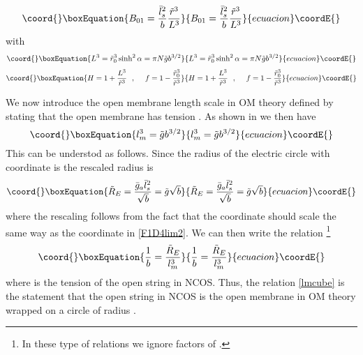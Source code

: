 \documentclass[a4paper,twoside,titlepage,12pt]{article}
\begin{document}
%
\begin{equation}\coord{}\boxEquation{
B_{01} = \frac{\lsb^2}{b} \frac{\tilde{r}^3}{L^3}
}{
B_{01} = \frac{\lsb^2}{b} \frac{\tilde{r}^3}{L^3}
}{ecuacion}\coordE{}\end{equation}
%
with
%
\begin{equation}\coord{}\boxEquation{
L^3 = \tilde{r}_0^3 \sinh^2 \alpha = \pi N \tilde{g} b^{3/2}
}{
L^3 = \tilde{r}_0^3 \sinh^2 \alpha = \pi N \tilde{g} b^{3/2}
}{ecuacion}\coordE{}\end{equation}
%
\begin{equation}\coord{}\boxEquation{
H = 1 + \frac{L^3}{\tilde{r}^3} \spa
f = 1 - \frac{\tilde{r}_0^3}{\tilde{r}^3}
}{
H = 1 + \frac{L^3}{\tilde{r}^3} \spa
f = 1 - \frac{\tilde{r}_0^3}{\tilde{r}^3}
}{ecuacion}\coordE{}\end{equation}
%

We now introduce the open membrane length scale \myHighlight{\( \lm \)}\coordHE{} in OM theory
defined by stating that the open membrane has tension \coordHE{}.
As shown in \cite{Gopakumar:2000ep,Bergshoeff:2000ai} we then have
%
\begin{equation}\coord{}\boxEquation{
\label{lmcube}
\lm^3 = \tilde{g} b^{3/2}
}{
\lm^3 = \tilde{g} b^{3/2}
}{ecuacion}\coordE{}\end{equation}
%
This can be understod as follows.
Since the radius of the electric circle with coordinate \coordHE{}
is \coordHE{} the rescaled radius is 
%
\begin{equation}\coord{}\boxEquation{
\tilde{R}_E = \frac{\gsba \lsb^2}{\sqrt{b}} = \tilde{g} \sqrt{b}
}{
\tilde{R}_E = \frac{\gsba \lsb^2}{\sqrt{b}} = \tilde{g} \sqrt{b}
}{ecuacion}\coordE{}\end{equation}
%
where the rescaling \coordHE{} follows
from the fact that the \coordHE{} coordinate should scale the same
way as the \coordHE{} coordinate in \eqref{F1D4lim2}.
We can then write the relation%
\footnote{In these type of relations we ignore factors of \myHighlight{$2\pi$}\coordHE{}.}
%
\begin{equation}\coord{}\boxEquation{
\frac{1}{b} = \frac{\tilde{R}_E}{\lm^3}
}{
\frac{1}{b} = \frac{\tilde{R}_E}{\lm^3}
}{ecuacion}\coordE{}\end{equation}
%
where \coordHE{} is the tension of the open string in NCOS.
Thus, the relation \eqref{lmcube} is the statement 
that the open string in NCOS is the open membrane in OM theory
wrapped on a circle of radius \coordHE{}.
\end{document}
